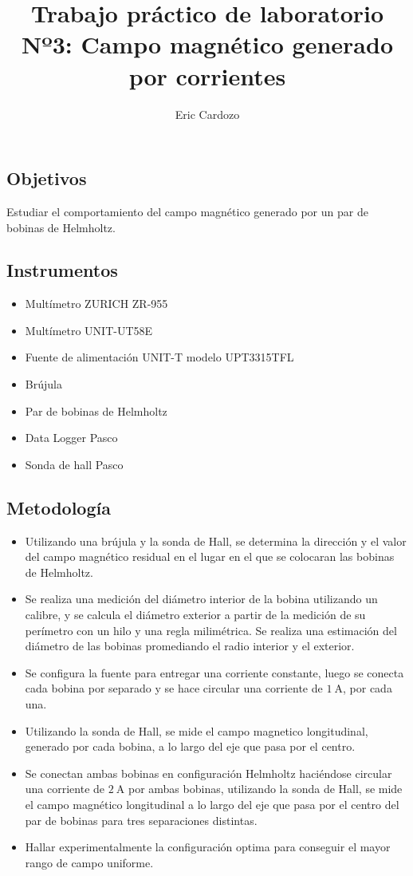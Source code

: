 \documentclass[12pt,a4paper]{article}
\author{Eric Cardozo}
\title{Trabajo pr\'actico de laboratorio Nº3: Campo magnético generado por corrientes}
\begin{document}

\maketitle

\subsection*{Objetivos}
Estudiar el comportamiento del campo magnético generado por un par de bobinas de Helmholtz.

\subsection*{Instrumentos}

\begin{itemize}
	\item Multímetro ZURICH ZR-955
	\item Multímetro UNIT-UT58E
	\item Fuente de alimentación UNIT-T modelo UPT3315TFL
	\item Brújula
	\item Par de bobinas de Helmholtz
	\item Data Logger Pasco
	\item Sonda de hall Pasco
\end{itemize}

\subsection*{Metodología}

\begin{itemize}
	\item Utilizando una brújula y la sonda de Hall, se determina la dirección y el valor del campo magnético residual en el lugar en el que se colocaran las bobinas de Helmholtz.
	\item Se realiza una medición del diámetro interior de la bobina utilizando un calibre, y se calcula el diámetro exterior a partir de la medición de su perímetro con un hilo y una regla milimétrica. Se realiza una estimación del diámetro de las bobinas promediando el radio interior y el exterior.
	\item Se configura la fuente para entregar una corriente constante, luego se conecta cada bobina por separado y se hace circular una corriente de $\SI{1}{\ampere}$, por cada una. 
	\item Utilizando la sonda de Hall, se mide el campo magnetico longitudinal, generado por cada bobina, a lo largo del eje que pasa por el centro.
	\item Se conectan ambas bobinas en configuración Helmholtz haciéndose circular una corriente de $\SI{2}{\ampere}$ por ambas bobinas, utilizando la sonda de Hall, se mide el campo magnético longitudinal a lo largo del eje que pasa por el centro del par de bobinas para tres separaciones distintas.
	\item Hallar experimentalmente la configuración optima para conseguir el mayor rango de campo uniforme. 
\end{itemize}	
	
\end{document}
